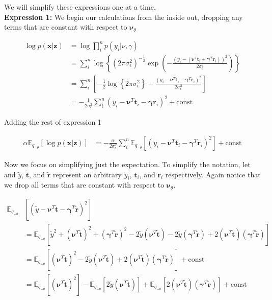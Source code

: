 \documentclass[letterpaper,12pt]{article}
\newcommand{\lc}{\left \{} %
\newcommand{\rc}{\right \}} %
\newcommand{\lp}{\left (} %
\newcommand{\rp}{\right )} %
\newcommand{\lb}{\left [} %
\newcommand{\rb}{\right ]} %
\newcommand{\pxgivenz}{\ensuremath{p(\boldsymbol{x} | \boldsymbol{z})}}
\newcommand{\sigmaepsilon}{\sigma_\epsilon^2} %
\newcommand{\nuv}{\boldsymbol{\nu}} %
\newcommand{\gammav}{\boldsymbol{\gamma}} %
\newcommand{\ti}{\boldsymbol{t}_i} %
\newcommand{\ri}{\boldsymbol{r}_i} %
\newcommand{\ytilde}{\ensuremath{\tilde{y}}} %
\newcommand{\ttilde}{\ensuremath{\tilde{\boldsymbol{t}}}} %
\newcommand{\rtilde}{\ensuremath{\tilde{\boldsymbol{r}}}} %
\newcommand{\pygiven}{\ensuremath{p(y_i | \nu, \gamma)}}
\newcommand{\nutheta}{\ensuremath{\nuv_\theta}} %
\newcommand{\Etheta}{\ensuremath{\mathbb{E}_{q_{-\theta}}}} %
\newcommand{\el}{\left[} %
\newcommand{\er}{\right]} %
\begin{document}
We will simplify these expressions one at a time.
\\

\noindent \textbf{Expression 1:} We begin our calculations from the inside out, dropping any terms that are constant with respect to \nutheta

\begin{equation}
\begin{split}
    \log \pxgivenz &= \log \prod_i^n \pygiven\\
    &= \sum_i^n \log \lc (2\pi \sigmaepsilon )^{-\frac{1}{2}}  \exp \lp - \frac{\lp y_i - (\nuv^T \ti + \gammav^T \ri) \rp^2}{2 \sigmaepsilon} \rp \rc \\
    &= \sum_i^n \lb -\frac{1}{2} \log \lc 2\pi \sigmaepsilon \rc - \frac{\lp y_i - \nuv^T \ti - \gammav^T \ri \rp^2}{2 \sigmaepsilon} \rb \\
    &= - \frac{1}{2 \sigmaepsilon} \sum_i^n \lp y_i - \nuv^T \ti - \gammav \ri \rp ^2 + \text{const}
\end{split}
\end{equation}

Adding the rest of expression 1

\begin{equation}
\begin{split}
     \alpha \Etheta \el \log \pxgivenz \er &= -\frac{\alpha}{2 \sigmaepsilon} \sum_i^n \Etheta \lb \lp y_i - \nuv^T \ti - \gammav^T \ri \rp ^2  \rb  + \text{const}
\end{split}
\end{equation}

Now we focus on simplifying just the expectation. To simplify the notation, let and $\ytilde$, $\ttilde$, and $\rtilde$ represent an arbitrary $y_i$, $\ti$, and $\ri$ respectively. Again notice that we drop all terms that are constant with respect to \nutheta.

\begin{equation}
\begin{split}
    \Etheta & \lb \lp \ytilde - \nuv^T \ttilde - \gammav^T \rtilde \rp^2 \rb \\
    &= \Etheta \lb \ytilde^2 + \lp \nuv^T \ttilde \rp^2 + \lp \gammav^T \rtilde \rp^2 - 2 \ytilde \lp \nuv^T \ttilde \rp - 2 \ytilde \lp \gammav^T \rtilde \rp + 2 \lp \nuv^T \ttilde \rp \lp \gammav^T \rtilde \rp \rb \\
    &= \Etheta \lb \lp \nuv^T \ttilde \rp^2  - 2 \ytilde \lp \nuv^T \ttilde \rp  + 2 \lp \nuv^T \ttilde \rp \lp \gammav^T \rtilde \rp \rb + \text{const} \\
    &= \Etheta \lb \lp \nuv^T \ttilde \rp^2 \rb - \Etheta \lb  2 \ytilde \lp \nuv^T \ttilde \rp  \rb + \Etheta \lb 2 \lp \nuv^T \ttilde \rp \lp \gammav^T \rtilde \rp \rb + \text{const} 
\end{split}
\end{equation}
\end{document}
